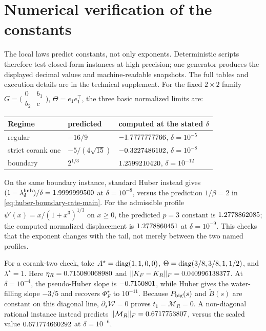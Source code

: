\section{Numerical verification of the constants}
\label{sec:numerics}

The local laws predict constants, not only exponents.  Deterministic scripts
therefore test closed-form instances at high precision; one generator
produces the displayed decimal values and machine-readable snapshots.
The full tables and execution details are in the technical supplement.  For the fixed
\(2\times2\) family
\(G=\bigl(\begin{smallmatrix}0&b_1\\b_2&c\end{smallmatrix}\bigr)\),
\(\Theta=e_1e_1^\top\), the three basic normalized limits are:
\begin{center}
\begin{tabular}{@{}lll@{}}
\toprule
Regime & predicted & computed at the stated \(\delta\)\\
\midrule
regular & \(-16/9\) & \(-1.7777777766\), \(\delta=10^{-5}\)\\
strict corank one & \(-5/(4\sqrt{15})\) & \(-0.3227486102\), \(\delta=10^{-8}\)\\
boundary & \(2^{1/3}\) & \(1.2599210420\), \(\delta=10^{-12}\)\\
\bottomrule
\end{tabular}
\end{center}
On the same boundary instance, standard Huber instead gives
\((1-\lambda_\delta^{\rm hub})/\delta=1.9999999500\) at
\(\delta=10^{-8}\), versus the prediction \(1/\beta=2\) in
\eqref{eq:huber-boundary-rate-main}.
For the admissible profile
\(\psi'(x)=x/(1+x^3)^{1/3}\) on \(x\ge0\), the predicted \(p=3\)
constant is \(1.2778862085\); the computed normalized displacement is
\(1.2778860451\) at \(\delta=10^{-9}\).  This checks that the exponent
changes with the tail, not merely between the two named profiles.

For a corank-two check, take
\(A^\star=\operatorname{diag}(1,1,0,0)\),
\(\Theta=\operatorname{diag}(3/8,3/8,1,1/2)\), and \(\lambda^\star=1\).
Here \(\eta_R=0.715080068980\) and
\(\|K_F-K_R\|_F=0.040996138377\).  At \(\delta=10^{-4}\), the
pseudo-Huber slope is \(-0.7150801\), while Huber gives the water-filling
slope \(-3/5\) and recovers \(\Phi_F^\star\) to \(10^{-11}\).
Because \(P_{\rm big}(s)\) and \(\widetilde B(s)\) are constant on this
diagonal line, \(\partial_s\mathcal W=0\) proves
\(t_1=\mathcal M_R=0\).  A non-diagonal rational instance instead predicts
\(\|\mathcal M_R\|_F=0.6717753807\), versus the scaled value
\(0.671774660292\) at \(\delta=10^{-6}\).

